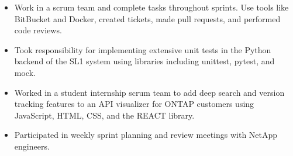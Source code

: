 \documentclass[10pt,a4paper]{altacv}
\begin{document}

\begin{fullwidth}
\makecvheader
\end{fullwidth}




\begin{itemize}
\item Work in a scrum team and complete tasks throughout sprints. Use tools like BitBucket and Docker, created tickets, made pull requests, and performed code reviews.
\item Took responsibility for implementing extensive unit tests in the Python backend of the SL1 system using libraries including unittest, pytest, and mock.
\end{itemize}

\divider

\begin{itemize}
\item Worked in a student internship scrum team to add deep search and version tracking features to an API visualizer for ONTAP customers using JavaScript, HTML, CSS, and the REACT library.
\item Participated in weekly sprint planning and review meetings with NetApp engineers.
\end{itemize}
\end{document}
